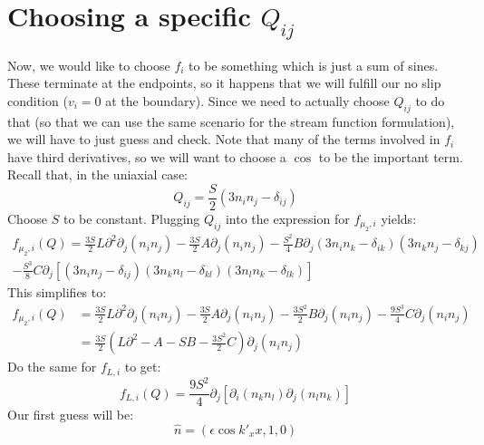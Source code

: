 \documentclass[reqno]{article}
\begin{document}
	\section{Choosing a specific $Q_{ij}$}
	Now, we would like to choose $f_i$ to be something which is just a sum of sines.
	These terminate at the endpoints, so it happens that we will fulfill our no slip condition ($v_i = 0$ at the boundary).
	Since we need to actually choose $Q_{ij}$ to do that (so that we can use the same scenario for the stream function formulation), we will have to just guess and check.
	Note that many of the terms involved in $f_i$ have third derivatives, so we will want to choose a $\cos$ to be the important term. 
	Recall that, in the uniaxial case:
	\begin{equation}
	Q_{ij} 
	= \frac{S}{2} \left( 3 n_i n_j - \delta_{ij} \right)
	\end{equation}
	Choose $S$ to be constant. 
	Plugging $Q_{ij}$ into the expression for $f_{\mu_2, i}$ yields:
	\begin{multline}
		f_{\mu_2, i} (Q)
		= \frac{3 S}{2} L \partial^2 \partial_j \left( n_i n_j \right)
		- \frac{3 S}{2} A \partial_j \left( n_i n_j \right)
		- \frac{S^2}{4} B \partial_j 
		\left( 3 n_i n_k - \delta_{ik} \right)
		\left( 3 n_k n_j - \delta_{kj} \right)\\
		- \frac{S^3}{8} C \partial_j
		\left[
		\left( 3 n_i n_j - \delta_{ij} \right)
		\left( 3 n_k n_l - \delta_{kl} \right)
		\left( 3 n_l n_k - \delta_{lk} \right)
		\right]
	\end{multline}
	This simplifies to:
	\begin{equation}
	\begin{split}
		f_{\mu_2, i} (Q)
		&= \frac{3 S}{2} L \partial^2 \partial_j \left( n_i n_j \right)
		- \frac{3 S}{2} A \partial_j \left( n_i n_j \right)
		- \frac{3 S^2}{2} B \partial_j \left( n_i n_j \right)
		- \frac{9 S^3}{4} C \partial_j
		\left( n_i n_j \right) \\
		&= \frac{3 S}{2} 
		\left(
		L \partial^2 - A - S B - \frac{3 S^2}{2} C
		\right)
		\partial_j \left( n_i n_j \right)
	\end{split}
	\end{equation}
	Do the same for $f_{L, i}$ to get:
	\begin{equation}
	f_{L, i} (Q) = \frac{9 S^2}{4} \partial_j 
	\left[
	\partial_i \left( n_k n_l \right)
	\partial_j \left( n_l n_k \right)
	\right]
	\end{equation}
	Our first guess will be:
	\begin{equation}
	\hat{n} = \left( \epsilon \cos k'_x x, 1, 0 \right)
	\end{equation}
\end{document}
